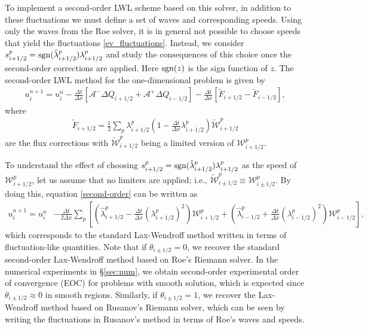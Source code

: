 \documentclass[preprint, 11pt]{article}
\newcommand{\W}{{\mathcal W}}
\newcommand{\A}{{\mathcal A}}
\newcommand{\sgn}{{\rm sgn}}
\begin{document}
To implement a second-order LWL scheme based on this solver, in addition to
these fluctuations we must define a set of waves and corresponding speeds.
Using only the waves from the Roe solver, it is in general not possible
to choose speeds that yield the fluctuations \eqref{ev_fluctuations}.
Instead, we consider
$s_{i+1/2}^p=\sgn(\hat\lambda_{i+1/2}^p)\lambda_{i+1/2}^p$
 and study the consequences of this choice once the second-order corrections are applied.
Here $\sgn(z)$ is the sign function of $z$.
The second-order LWL method for the one-dimensional problem is given by
\begin{align}\label{second-order}
  u_i^{n+1}=u_i^n
  -\frac{\Delta t}{\Delta x}\left[\A^-\Delta Q_{i+1/2}+\A^+\Delta Q_{i-1/2}\right]
  -\frac{\Delta t}{\Delta x}\left[\tilde F_{i+1/2}-\tilde F_{i-1/2}\right],
\end{align}
where
\begin{align*}
  \tilde F_{i+1/2} = \frac{1}{2}\sum_p\lambda_{i+1/2}^p
  \left(1-\frac{\Delta t}{\Delta x}\lambda_{i+1/2}^p\right)\tilde\W_{i+1/2}^p
\end{align*}
are the flux corrections with $\tilde\W_{i+1/2}^p$ being a limited version of $\W_{i+1/2}^p$.

To understand the effect of choosing $s_{i+1/2}^p=\sgn(\hat\lambda_{i+1/2}^p)\lambda_{i+1/2}^p$
as the speed of $\W_{i+1/2}^p$,
let us assume that no limiters are applied; i.e., $\tilde\W_{i\pm 1/2}^p\equiv \W_{i\pm 1/2}^p$.
By doing this, equation \eqref{second-order} can be written as
\begin{align*}
  u_i^{n+1}=u_i^n
  &-\frac{\Delta t}{2 \Delta x}
  \sum_p
  \left[\left(\hat\lambda_{i+1/2}^p -\frac{\Delta t}{\Delta x}(\lambda_{i+1/2}^p)^2 \right)\W_{i+1/2}^p
  +
  \left(\hat\lambda_{i-1/2}^p +\frac{\Delta t}{\Delta x}(\lambda_{i-1/2}^p)^2 \right)\W_{i-1/2}^p\right],
\end{align*}
which corresponds to the standard Lax-Wendroff method written in terms of fluctuation-like quantities.
Note that if $\theta_{i\pm 1/2}=0$, we recover the standard second-order Lax-Wendroff method based on
Roe's Riemann solver.
In the numerical experiments in \S\ref{sec:num}, we obtain second-order experimental
order of convergence (EOC) for problems with smooth solution, which is expected since
$\theta_{i\pm 1/2}\approx 0$ in smooth regions.
Similarly, if $\theta_{i\pm 1/2}=1$, we recover the Lax-Wendroff method based on Rusanov's Riemann solver,
which can be seen by writing the fluctuations in Rusanov's method in terms of Roe's waves and speeds.
\end{document}
